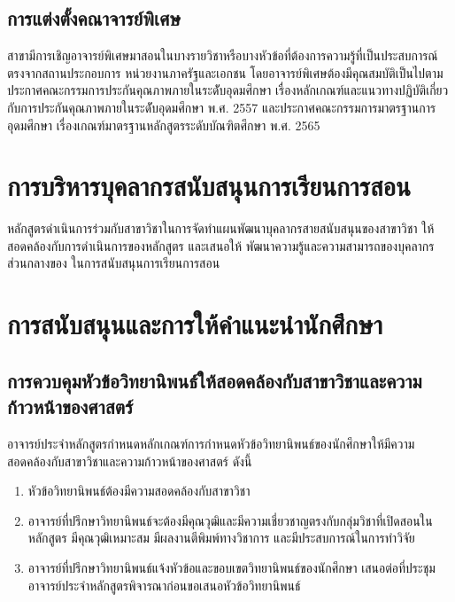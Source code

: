 \subsection{การแต่งตั้งคณาจารย์พิเศษ}
สาขา\thdegreebranch{}มีการเชิญอาจารย์พิเศษมาสอนในบางรายวิชาหรือบางหัวข้อที่ต้องการความรู้ที่เป็นประสบการณ์ตรงจากสถานประกอบการ หน่วยงานภาครัฐและเอกชน 
โดยอาจารย์พิเศษต้องมีคุณสมบัติเป็นไปตามประกาศคณะกรรมการประกันคุณภาพภายในระดัับอุดมศึกษา เรื่องหลักเกณฑ์และแนวทางปฏิบัติเกี่ยวกับการประกันคุณภาพภายในระดัับอุดมศึกษา พ.ศ. 2557 และประกาศคณะกรรมการมาตรฐานการอุดมศึกษา เรื่องเกณฑ์มาตรฐานหลักสูตรระดับบัณฑิตศึกษา พ.ศ. 2565

\section{การบริหารบุคลากรสนับสนุนการเรียนการสอน}
หลักสูตรดำเนินการร่วมกับสาขาวิชาในการจัดทำแผนพัฒนาบุคลากรสายสนับสนุนของสาขาวิชา\thdegreebranch{} ให้สอดคล้องกับการดำเนินการของหลักสูตร และเสนอให้\faculty{} พัฒนาความรู้และความสามารถของบุคลากรส่วนกลางของ\faculty{} ในการสนับสนุนการเรียนการสอน

 \section{การสนับสนุนและการให้คำแนะนำนักศึกษา}
 \subsection{การควบคุมหัวข้อวิทยานิพนธ์ให้สอดคล้องกับสาขาวิชาและความก้าวหน้าของศาสตร์}
 อาจารย์ประจำหลักสูตรกำหนดหลักเกณฑ์การกำหนดหัวข้อวิทยานิพนธ์ของนักศึกษาให้มีความสอดคล้องกับสาขาวิชาและความก้าวหน้าของศาสตร์ ดังนี้
  \begin{enumerate}
   	\item หัวข้อวิทยานิพนธ์ต้องมีความสอดคล้องกับสาขาวิชา\thdegreebranch
   	\item อาจารย์ที่ปรึกษาวิทยานิพนธ์จะต้องมีคุณวุฒิและมีความเชี่ยวชาญตรงกับกลุ่มวิชาที่เปิดสอนในหลักสูตร มีคุณวุฒิเหมาะสม มีผลงานตีพิมพ์ทางวิชาการ และมีประสบการณ์ในการทำวิจัย   	
   	\item  อาจารย์ที่ปรึกษาวิทยานิพนธ์แจ้งหัวข้อและขอบเขตวิทยานิพนธ์ของนักศึกษา เสนอต่อที่ประชุมอาจารย์ประจำหลักสูตรพิจารณาก่อนขอเสนอหัวข้อวิทยานิพนธ์  	
   	\end{enumerate}  
  
